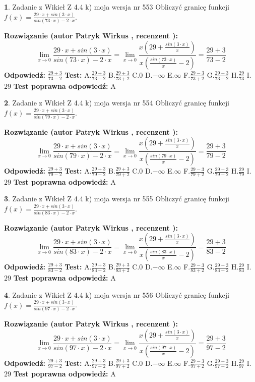 \documentclass[12pt, a4paper]{article}
\theoremstyle{definition} %
\newtheorem{zad}{}
\newcommand{\zadStart}[1]{\begin{zad}#1\newline}
\newcommand{\zadStop}{\end{zad}}
\newcommand{\rozwStart}[2]{\noindent \textbf{Rozwiązanie (autor #1 , recenzent #2): }\newline}
\newcommand{\rozwStop}{\newline}
\newcommand{\odpStart}{\noindent \textbf{Odpowiedź:}\newline}
\newcommand{\odpStop}{\newline}
\newcommand{\testStart}{\noindent \textbf{Test:}\newline}
\newcommand{\testStop}{\newline}
\newcommand{\kluczStart}{\noindent \textbf{Test poprawna odpowiedź:}\newline}
\newcommand{\kluczStop}{\newline}
\begin{document}
\zadStart{Zadanie z Wikieł Z 4.4 k) moja wersja nr 553}
Obliczyć granicę funkcji $f(x)=\frac{29\cdot x +sin(3\cdot x)}{sin(73\cdot x) -2\cdot x}$.
\zadStop
\rozwStart{Patryk Wirkus}{}
$$\lim\limits_{x\to 0}\frac{29\cdot x +sin(3\cdot x)}{sin(73\cdot x) -2\cdot x}
=\lim\limits_{x\to 0}\frac{x(29+\frac{sin(3\cdot x)}{x})}{x(\frac{sin(73\cdot x)}{x}-2)}
=\frac{29+3}{73-2}$$
\rozwStop
\odpStart
$\frac{29+3}{73-2}$
\odpStop
\testStart
A.$\frac{29+3}{73-2}$
B.$\frac{29+3}{73+2}$
C.$0$
D.$-\infty$
E.$\infty$
F.$\frac{29-3}{73+2}$
G.$\frac{29-3}{73-2}$
H.$\frac{29}{73}$
I.$29$
\testStop
\kluczStart
A
\kluczStop



\zadStart{Zadanie z Wikieł Z 4.4 k) moja wersja nr 554}
Obliczyć granicę funkcji $f(x)=\frac{29\cdot x +sin(3\cdot x)}{sin(79\cdot x) -2\cdot x}$.
\zadStop
\rozwStart{Patryk Wirkus}{}
$$\lim\limits_{x\to 0}\frac{29\cdot x +sin(3\cdot x)}{sin(79\cdot x) -2\cdot x}
=\lim\limits_{x\to 0}\frac{x(29+\frac{sin(3\cdot x)}{x})}{x(\frac{sin(79\cdot x)}{x}-2)}
=\frac{29+3}{79-2}$$
\rozwStop
\odpStart
$\frac{29+3}{79-2}$
\odpStop
\testStart
A.$\frac{29+3}{79-2}$
B.$\frac{29+3}{79+2}$
C.$0$
D.$-\infty$
E.$\infty$
F.$\frac{29-3}{79+2}$
G.$\frac{29-3}{79-2}$
H.$\frac{29}{79}$
I.$29$
\testStop
\kluczStart
A
\kluczStop



\zadStart{Zadanie z Wikieł Z 4.4 k) moja wersja nr 555}
Obliczyć granicę funkcji $f(x)=\frac{29\cdot x +sin(3\cdot x)}{sin(83\cdot x) -2\cdot x}$.
\zadStop
\rozwStart{Patryk Wirkus}{}
$$\lim\limits_{x\to 0}\frac{29\cdot x +sin(3\cdot x)}{sin(83\cdot x) -2\cdot x}
=\lim\limits_{x\to 0}\frac{x(29+\frac{sin(3\cdot x)}{x})}{x(\frac{sin(83\cdot x)}{x}-2)}
=\frac{29+3}{83-2}$$
\rozwStop
\odpStart
$\frac{29+3}{83-2}$
\odpStop
\testStart
A.$\frac{29+3}{83-2}$
B.$\frac{29+3}{83+2}$
C.$0$
D.$-\infty$
E.$\infty$
F.$\frac{29-3}{83+2}$
G.$\frac{29-3}{83-2}$
H.$\frac{29}{83}$
I.$29$
\testStop
\kluczStart
A
\kluczStop



\zadStart{Zadanie z Wikieł Z 4.4 k) moja wersja nr 556}
Obliczyć granicę funkcji $f(x)=\frac{29\cdot x +sin(3\cdot x)}{sin(97\cdot x) -2\cdot x}$.
\zadStop
\rozwStart{Patryk Wirkus}{}
$$\lim\limits_{x\to 0}\frac{29\cdot x +sin(3\cdot x)}{sin(97\cdot x) -2\cdot x}
=\lim\limits_{x\to 0}\frac{x(29+\frac{sin(3\cdot x)}{x})}{x(\frac{sin(97\cdot x)}{x}-2)}
=\frac{29+3}{97-2}$$
\rozwStop
\odpStart
$\frac{29+3}{97-2}$
\odpStop
\testStart
A.$\frac{29+3}{97-2}$
B.$\frac{29+3}{97+2}$
C.$0$
D.$-\infty$
E.$\infty$
F.$\frac{29-3}{97+2}$
G.$\frac{29-3}{97-2}$
H.$\frac{29}{97}$
I.$29$
\testStop
\kluczStart
A
\kluczStop
\end{document}
